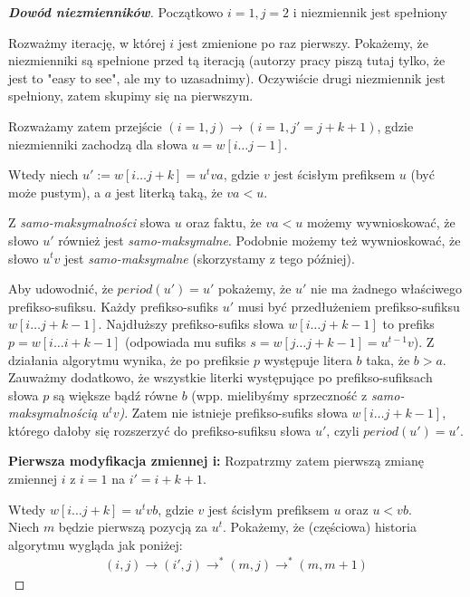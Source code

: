 \documentclass{article}
\begin{document}
\begin{proof}[\textbf{Dowód niezmienników}]
Początkowo $i = 1, j = 2$ i niezmiennik jest spełniony

Rozważmy iterację, w której $i$ jest zmienione po raz pierwszy. Pokażemy, że niezmienniki są spełnione przed tą iteracją 
(autorzy pracy piszą tutaj tylko, że jest to "easy to see", ale my to uzasadnimy). Oczywiście drugi niezmiennik jest spełniony, zatem skupimy się na pierwszym.

Rozważamy zatem przejście $(i=1, j) \rightarrow (i=1, j' = j + k + 1)$, gdzie niezmienniki zachodzą dla słowa $u = w[i \ldots j-1]$.

Wtedy niech $u' := w[i\ldots j + k] = u^tva$, gdzie $v$ jest ścisłym prefiksem $u$ (być może pustym), a $a$ jest literką taką, że $va < u$.

Z \textit{samo-maksymalności} słowa $u$ oraz faktu, że $va < u$ możemy wywnioskować, że słowo $u'$ również jest \textit{samo-maksymalne}.
Podobnie możemy też wywnioskować, że słowo $u^tv$ jest \textit{samo-maksymalne} (skorzystamy z tego później). 

Aby udowodnić, że $period(u') = u'$ pokażemy, że $u'$ nie ma żadnego właściwego prefikso-sufiksu. 
Każdy prefikso-sufiks $u'$ musi być przedłużeniem prefikso-sufiksu $w[i\ldots j+k-1]$. 
Najdłuższy prefikso-sufiks słowa $w[i\ldots j+k-1]$ to prefiks $p = w[i\ldots i+k-1]$ (odpowiada mu sufiks $s = w[j\ldots j+k-1] = u^{t-1}v$).
Z działania algorytmu wynika, że po prefiksie $p$ występuje litera $b$ taka, że $b > a$. 
Zauważmy dodatkowo, że wszystkie literki występujące po prefikso-sufiksach słowa $p$ są większe bądź równe $b$ (wpp. mielibyśmy sprzeczność z \textit{samo-maksymalnością $u^tv$)}.
Zatem nie istnieje prefikso-sufiks słowa $w[i\ldots j+k-1]$, którego dałoby się rozszerzyć do prefikso-sufiksu słowa $u'$, czyli $period(u') = u'$.

\vspace{5pt}

\textbf{Pierwsza modyfikacja zmiennej i:} Rozpatrzmy zatem pierwszą zmianę zmiennej $i$ z $i=1$ na $i' = i + k + 1$. 

Wtedy $w[i\ldots j+k] = u^t vb$, gdzie $v$ jest ścisłym prefiksem $u$ oraz $u < vb$.\\
Niech $m$ będzie pierwszą pozycją za $u^t$. Pokażemy, że (częściowa) historia algorytmu wygląda jak poniżej:
\begin{align*}
    (i, j) \rightarrow (i', j) \rightarrow^{*} (m, j) \rightarrow^{*}(m, m+1)
\end{align*}


\end{proof}
\end{document}

